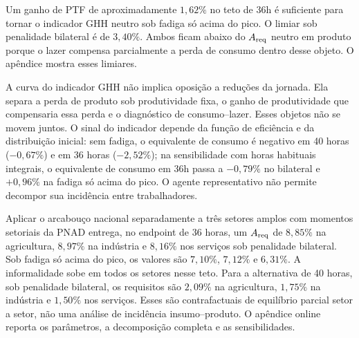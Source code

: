 Um ganho de PTF de aproximadamente $1{,}62\%$ no teto de 36h é suficiente para tornar o indicador GHH neutro sob fadiga só acima do pico. O limiar sob penalidade bilateral é de $3{,}40\%$. Ambos ficam abaixo do $A_{\mathrm{req}}$ neutro em produto porque o lazer compensa parcialmente a perda de consumo dentro desse objeto. O apêndice mostra esses limiares.

A curva do indicador GHH não implica oposição a reduções da jornada. Ela separa a perda de produto sob produtividade fixa, o ganho de produtividade que compensaria essa perda e o diagnóstico de consumo--lazer. Esses objetos não se movem juntos. O sinal do indicador depende da função de eficiência e da distribuição inicial: sem fadiga, o equivalente de consumo é negativo em 40 horas ($-0{,}67\%$) e em 36 horas ($-2{,}52\%$); na sensibilidade com horas habituais integrais, o equivalente de consumo em 36h passa a $-0{,}79\%$ no bilateral e $+0{,}96\%$ na fadiga só acima do pico. O agente representativo não permite decompor sua incidência entre trabalhadores.

Aplicar o arcabouço nacional separadamente a três setores amplos com momentos setoriais da PNAD entrega, no endpoint de 36 horas, um $A_{\mathrm{req}}$ de $8{,}85\%$ na agricultura, $8{,}97\%$ na indústria e $8{,}16\%$ nos serviços sob penalidade bilateral. Sob fadiga só acima do pico, os valores são $7{,}10\%$, $7{,}12\%$ e $6{,}31\%$. A informalidade sobe em todos os setores nesse teto. Para a alternativa de 40 horas, sob penalidade bilateral, os requisitos são $2{,}09\%$ na agricultura, $1{,}75\%$ na indústria e $1{,}50\%$ nos serviços. Esses são contrafactuais de equilíbrio parcial setor a setor, não uma análise de incidência insumo--produto. O apêndice online reporta os parâmetros, a decomposição completa e as sensibilidades.
